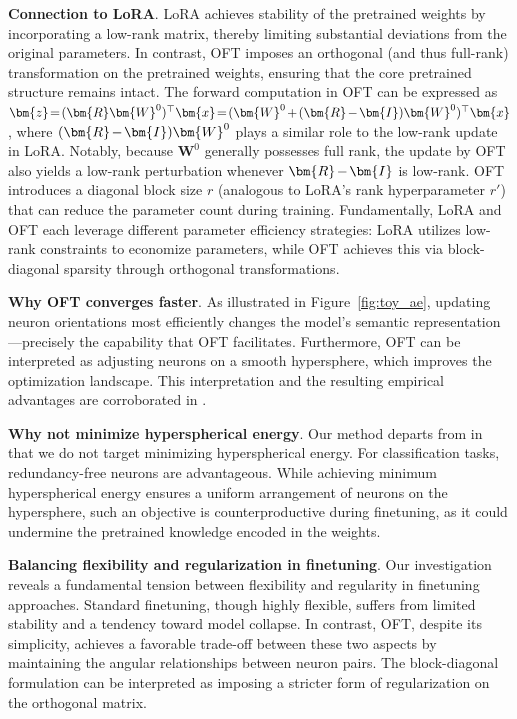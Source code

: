 \textbf{Connection to LoRA}. LoRA achieves stability of the pretrained weights by incorporating a low-rank matrix, thereby limiting substantial deviations from the original parameters. In contrast, OFT imposes an orthogonal (and thus full-rank) transformation on the pretrained weights, ensuring that the core pretrained structure remains intact. The forward computation in OFT can be expressed as $\thickmuskip=2mu \medmuskip=2mu \bm{z}=(\bm{R}\bm{W}^0)^\top\bm{x}=(\bm{W}^0+(\bm{R}-\bm{I})\bm{W}^0)^\top\bm{x}$, where $\thickmuskip=2mu \medmuskip=2mu (\bm{R}-\bm{I})\bm{W}^0$ plays a similar role to the low-rank update in LoRA. Notably, because $\bm{W}^0$ generally possesses full rank, the update by OFT also yields a low-rank perturbation whenever $\thickmuskip=2mu \medmuskip=2mu \bm{R}-\bm{I}$ is low-rank. OFT introduces a diagonal block size $r$ (analogous to LoRA’s rank hyperparameter $r'$) that can reduce the parameter count during training. Fundamentally, LoRA and OFT each leverage different parameter efficiency strategies: LoRA utilizes low-rank constraints to economize parameters, while OFT achieves this via block-diagonal sparsity through orthogonal transformations.

\textbf{Why OFT converges faster}. As illustrated in Figure~\ref{fig:toy_ae}, updating neuron orientations most efficiently changes the model's semantic representation—precisely the capability that OFT facilitates. Furthermore, OFT can be interpreted as adjusting neurons on a smooth hypersphere, which improves the optimization landscape. This interpretation and the resulting empirical advantages are corroborated in \cite{liu2021orthogonal}.

\textbf{Why not minimize hyperspherical energy}. Our method departs from \cite{liu2021orthogonal} in that we do not target minimizing hyperspherical energy. For classification tasks, redundancy-free neurons are advantageous. While achieving minimum hyperspherical energy ensures a uniform arrangement of neurons on the hypersphere, such an objective is counterproductive during finetuning, as it could undermine the pretrained knowledge encoded in the weights.

\textbf{Balancing flexibility and regularization in finetuning}. Our investigation reveals a fundamental tension between flexibility and regularity in finetuning approaches. Standard finetuning, though highly flexible, suffers from limited stability and a tendency toward model collapse. In contrast, OFT, despite its simplicity, achieves a favorable trade-off between these two aspects by maintaining the angular relationships between neuron pairs. The block-diagonal formulation can be interpreted as imposing a stricter form of regularization on the orthogonal matrix.

